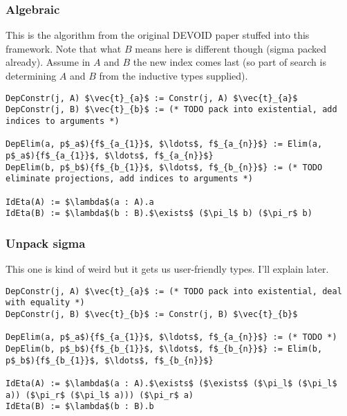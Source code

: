 \subsubsection{Algebraic}

This is the algorithm from the original DEVOID paper stuffed into this framework.
Note that what $B$ means here is different though (sigma packed already).
Assume in $A$ and $B$ the new index comes last (so part of search is determining
$A$ and $B$ from the inductive types supplied).


\begin{lstlisting}
DepConstr(j, A) $\vec{t}_{a}$ := Constr(j, A) $\vec{t}_{a}$
DepConstr(j, B) $\vec{t}_{b}$ := (* TODO pack into existential, add indices to arguments *)

DepElim(a, p$_a$){f$_{a_{1}}$, $\ldots$, f$_{a_{n}}$} := Elim(a, p$_a$){f$_{a_{1}}$, $\ldots$, f$_{a_{n}}$}
DepElim(b, p$_b$){f$_{b_{1}}$, $\ldots$, f$_{b_{n}}$} := (* TODO eliminate projections, add indices to arguments *)

IdEta(A) := $\lambda$(a : A).a
IdEta(B) := $\lambda$(b : B).$\exists$ ($\pi_l$ b) ($\pi_r$ b)
\end{lstlisting}

\subsubsection{Unpack sigma}

This one is kind of weird but it gets us user-friendly types. I'll explain later.

\begin{lstlisting}
DepConstr(j, A) $\vec{t}_{a}$ := (* TODO pack into existential, deal with equality *)
DepConstr(j, B) $\vec{t}_{b}$ := Constr(j, B) $\vec{t}_{b}$

DepElim(a, p$_a$){f$_{a_{1}}$, $\ldots$, f$_{a_{n}}$} := (* TODO *)
DepElim(b, p$_b$){f$_{b_{1}}$, $\ldots$, f$_{b_{n}}$} := Elim(b, p$_b$){f$_{b_{1}}$, $\ldots$, f$_{b_{n}}$}

IdEta(A) := $\lambda$(a : A).$\exists$ ($\exists$ ($\pi_l$ ($\pi_l$ a)) ($\pi_r$ ($\pi_l$ a))) ($\pi_r$ a)
IdEta(B) := $\lambda$(b : B).b
\end{lstlisting}

